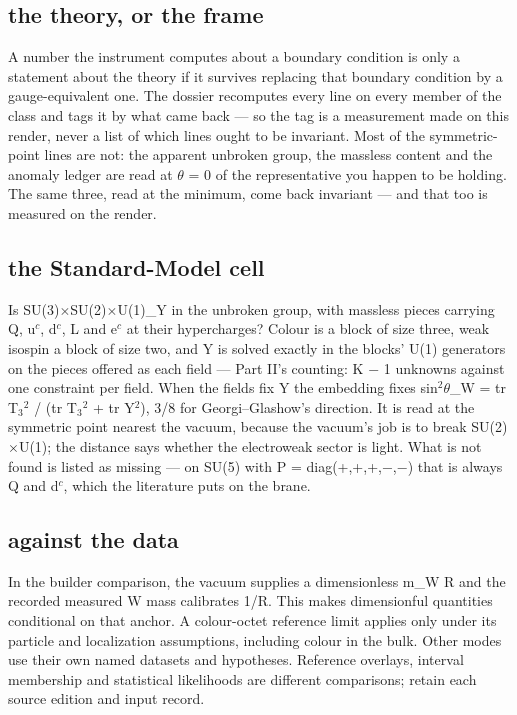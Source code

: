 \documentclass[11pt,a4paper]{article}
\begin{document}
\subsection*{the theory, or the frame}
A number the instrument computes about a boundary condition is only a statement about the theory if it survives replacing that boundary condition by a gauge-equivalent one. The dossier recomputes every line on every member of the class and tags it by what came back --- so the tag is a measurement made on this render, never a list of which lines ought to be invariant. Most of the symmetric-point lines are not: the apparent unbroken group, the massless content and the anomaly ledger are read at \ensuremath{\theta} = 0 of the representative you happen to be holding. The same three, read at the minimum, come back invariant --- and that too is measured on the render.

\subsection*{the Standard-Model cell}
Is SU(3)\ensuremath{\times}SU(2)\ensuremath{\times}U(1)\_Y in the unbroken group, with massless pieces carrying Q, u\ensuremath{{}^{c}}, d\ensuremath{{}^{c}}, L and e\ensuremath{{}^{c}} at their hypercharges? Colour is a block of size three, weak isospin a block of size two, and Y is solved exactly in the blocks' U(1) generators on the pieces offered as each field --- Part II's counting: K \ensuremath{-} 1 unknowns against one constraint per field. When the fields fix Y the embedding fixes sin\ensuremath{{}^{2}}\ensuremath{\theta}\_W = tr T\ensuremath{{}_{3}}\ensuremath{{}^{2}} / (tr T\ensuremath{{}_{3}}\ensuremath{{}^{2}} + tr Y\ensuremath{{}^{2}}), 3/8 for Georgi--Glashow's direction. It is read at the symmetric point nearest the vacuum, because the vacuum's job is to break SU(2)\ensuremath{\times}U(1); the distance says whether the electroweak sector is light. What is not found is listed as missing --- on SU(5) with P = diag(+,+,+,\ensuremath{-},\ensuremath{-}) that is always Q and d\ensuremath{{}^{c}}, which the literature puts on the brane.

\subsection*{against the data}
In the builder comparison, the vacuum supplies a dimensionless m\_W R and the recorded measured W mass calibrates 1/R. This makes dimensionful quantities conditional on that anchor. A colour-octet reference limit applies only under its particle and localization assumptions, including colour in the bulk. Other modes use their own named datasets and hypotheses. Reference overlays, interval membership and statistical likelihoods are different comparisons; retain each source edition and input record.
\end{document}
